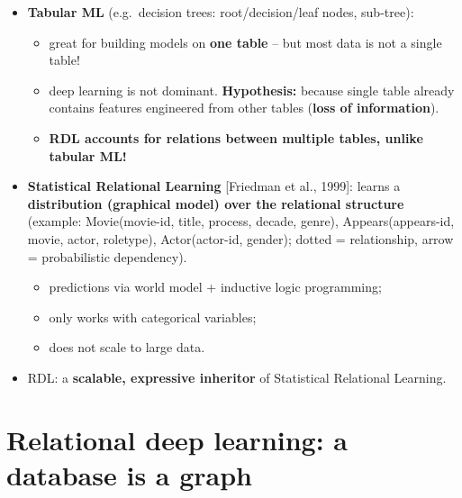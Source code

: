 \begin{itemize}
  \item \textbf{Tabular ML} (e.g.\ decision trees: root/decision/leaf nodes, sub-tree):
    \begin{itemize}
      \item great for building models on \textbf{one table} -- but most data is not a
        single table!
      \item deep learning is not dominant. \textbf{Hypothesis:} because single table
        already contains features engineered from other tables (\textbf{loss of
        information}).
      \item \textbf{RDL accounts for relations between multiple tables, unlike tabular
        ML!}
    \end{itemize}
  \item \textbf{Statistical Relational Learning} [Friedman et al., 1999]: learns a
    \textbf{distribution (graphical model) over the relational structure} (example:
    Movie(movie-id, title, process, decade, genre), Appears(appears-id, movie, actor,
    roletype), Actor(actor-id, gender); dotted = relationship, arrow = probabilistic
    dependency).
    \begin{itemize}
      \item predictions via world model + inductive logic programming;
      \item only works with categorical variables;
      \item does not scale to large data.
    \end{itemize}
  \item RDL: a \textbf{scalable, expressive inheritor} of Statistical Relational Learning.
\end{itemize}

\section{Relational deep learning: a database is a graph}\label{sec:lec12-dbgraph}

